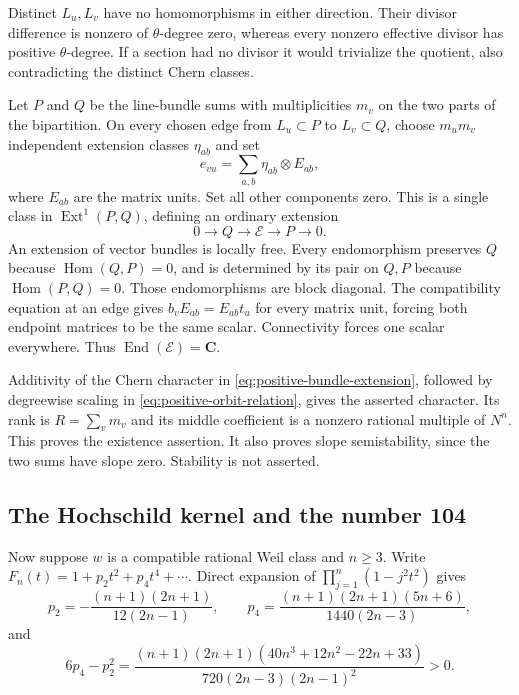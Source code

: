 Distinct $L_u,L_v$ have no homomorphisms in either direction.
Their divisor difference is nonzero of $\theta$-degree zero,
whereas every nonzero effective divisor has positive $\theta$-degree.
If a section had no divisor it would trivialize the quotient,
also contradicting the distinct Chern classes.

Let $P$ and $Q$ be the line-bundle sums with multiplicities $m_v$
on the two parts of the bipartition.  On every chosen edge from
$L_u\subset P$ to $L_v\subset Q$, choose $m_um_v$ independent
extension classes $\eta_{ab}$ and set
\[
 e_{vu}=\sum_{a,b}\eta_{ab}\otimes E_{ab},
\]
where $E_{ab}$ are the matrix units.  Set all other components zero.
This is a single class in $\operatorname{Ext}^1(P,Q)$, defining
an ordinary extension
\begin{equation}
 0\longrightarrow Q\longrightarrow\mathcal E
                   \longrightarrow P\longrightarrow0.
 \label{eq:positive-bundle-extension}
\end{equation}
An extension of vector bundles is locally free.  Every endomorphism
preserves $Q$ because $\operatorname{Hom}(Q,P)=0$, and is determined
by its pair on $Q,P$ because $\operatorname{Hom}(P,Q)=0$.
Those endomorphisms are block diagonal.  The compatibility equation
at an edge gives $b_vE_{ab}=E_{ab}t_u$ for every matrix unit, forcing
both endpoint matrices to be the same scalar.  Connectivity forces
one scalar everywhere.  Thus $\operatorname{End}(\mathcal E)=\mathbf C$.

Additivity of the Chern character in
\eqref{eq:positive-bundle-extension}, followed by degreewise scaling
in \eqref{eq:positive-orbit-relation}, gives the asserted character.
Its rank is $R=\sum_vm_v$ and its middle coefficient is a nonzero
rational multiple of $N^n$.  This proves the existence assertion.
It also proves slope semistability, since the two sums have slope
zero.  Stability is not asserted.

\subsection{The Hochschild kernel and the number 104}

Now suppose $w$ is a compatible rational Weil class and $n\ge3$.
Write $F_n(t)=1+p_2t^2+p_4t^4+\cdots$.  Direct expansion of
$\prod_{j=1}^n(1-j^2t^2)$ gives
\[
 p_2=-\frac{(n+1)(2n+1)}{12(2n-1)},\qquad
 p_4=\frac{(n+1)(2n+1)(5n+6)}{1440(2n-3)},
\]
and
\begin{equation}
 6p_4-p_2^2=
 \frac{(n+1)(2n+1)(40n^3+12n^2-22n+33)}
 {720(2n-3)(2n-1)^2}>0.
 \label{eq:positive-rank-minor}
\end{equation}

